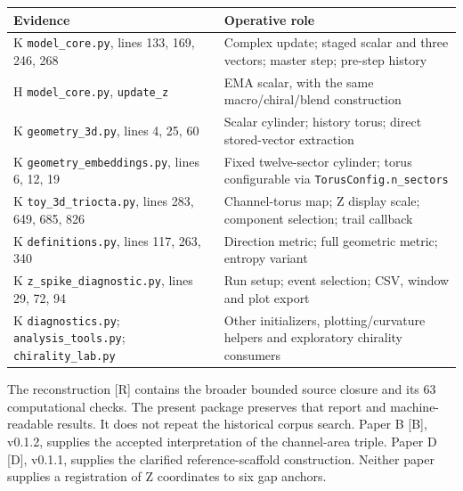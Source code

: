 \documentclass[
  11pt,
  a4paper,
]{article}
\newcounter{none} %
\begin{document}
{\def\LTcaptype{none} %
\begin{longtable}[]{@{}
  >{\raggedright\arraybackslash}p{}
  >{\raggedright\arraybackslash}p{}@{}}
\toprule\noalign{}
\begin{minipage}[b]{\linewidth}\raggedright
Evidence
\end{minipage} & \begin{minipage}[b]{\linewidth}\raggedright
Operative role
\end{minipage} \\
\midrule\noalign{}
\endhead
\bottomrule\noalign{}
\endlastfoot
K \texttt{model\_core.py}, lines 133, 169, 246, 268 & Complex update; staged scalar and three vectors; master step; pre-step history \\
H \texttt{model\_core.py}, \texttt{update\_z} & EMA scalar, with the same macro/chiral/blend construction \\
K \texttt{geometry\_3d.py}, lines 4, 25, 60 & Scalar cylinder; history torus; direct stored-vector extraction \\
K \texttt{geometry\_embeddings.py}, lines 6, 12, 19 & Fixed twelve-sector cylinder; torus configurable via \texttt{TorusConfig.n\_sectors} \\
K \texttt{toy\_3d\_triocta.py}, lines 283, 649, 685, 826 & Channel-torus map; Z display scale; component selection; trail callback \\
K \texttt{definitions.py}, lines 117, 263, 340 & Direction metric; full geometric metric; entropy variant \\
K \texttt{z\_spike\_diagnostic.py}, lines 29, 72, 94 & Run setup; event selection; CSV, window and plot export \\
K \texttt{diagnostics.py}; \texttt{analysis\_tools.py}; \texttt{chirality\_lab.py} & Other initializers, plotting/curvature helpers and exploratory chirality consumers \\
\end{longtable}
}

The reconstruction {[}R{]} contains the broader bounded source closure and its 63 computational checks. The present package preserves that report and machine-readable results. It does not repeat the historical corpus search. Paper B {[}B{]}, v0.1.2, supplies the accepted interpretation of the channel-area triple. Paper D {[}D{]}, v0.1.1, supplies the clarified reference-scaffold construction. Neither paper supplies a registration of Z coordinates to six gap anchors.
\end{document}
